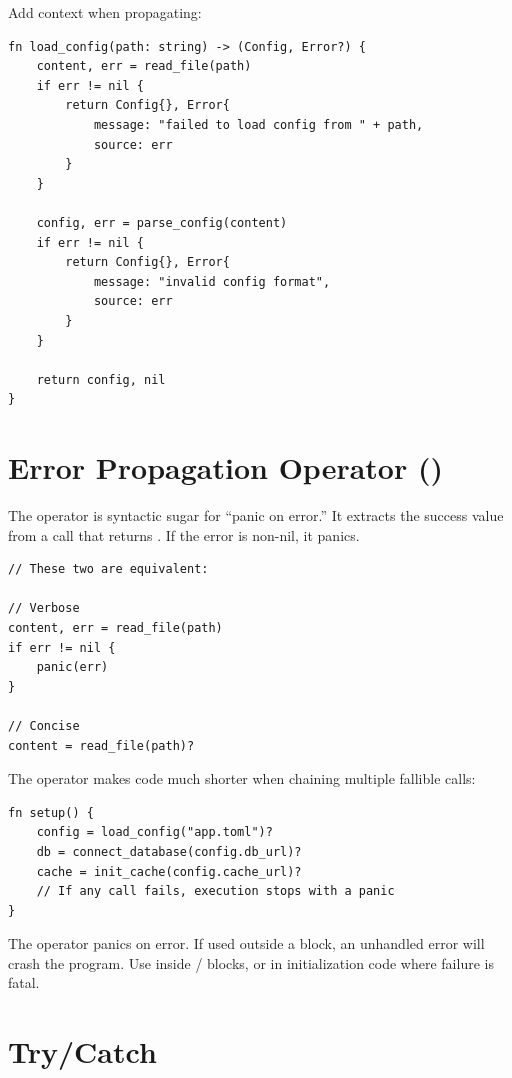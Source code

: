 Add context when propagating:

\begin{lstlisting}
fn load_config(path: string) -> (Config, Error?) {
    content, err = read_file(path)
    if err != nil {
        return Config{}, Error{
            message: "failed to load config from " + path,
            source: err
        }
    }

    config, err = parse_config(content)
    if err != nil {
        return Config{}, Error{
            message: "invalid config format",
            source: err
        }
    }

    return config, nil
}
\end{lstlisting}

\section{Error Propagation Operator ()}

The  operator is syntactic sugar for ``panic on error.'' It extracts the success value from a call that returns . If the error is non-nil, it panics.

\begin{lstlisting}
// These two are equivalent:

// Verbose
content, err = read_file(path)
if err != nil {
    panic(err)
}

// Concise
content = read_file(path)?
\end{lstlisting}

The  operator makes code much shorter when chaining multiple fallible calls:

\begin{lstlisting}
fn setup() {
    config = load_config("app.toml")?
    db = connect_database(config.db_url)?
    cache = init_cache(config.cache_url)?
    // If any call fails, execution stops with a panic
}
\end{lstlisting}

\begin{warning}
The  operator panics on error. If used outside a  block, an unhandled error will crash the program. Use  inside / blocks, or in initialization code where failure is fatal.
\end{warning}

\section{Try/Catch}

